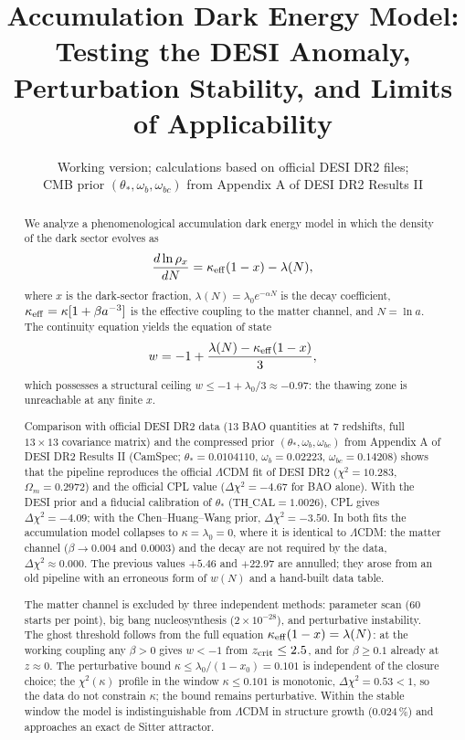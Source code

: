 \documentclass[11pt,a4paper]{article}
\title{Accumulation Dark Energy Model: Testing the DESI Anomaly,\\ Perturbation Stability, and Limits of Applicability}
\author{}
\date{Working version; calculations based on official DESI DR2 files;\\
CMB prior $(\theta_*,\omega_b,\omega_{bc})$ from Appendix A of DESI DR2 Results II}
\begin{document}
\maketitle

\begin{abstract}
We analyze a phenomenological accumulation dark energy model in which the density of the dark sector evolves as
\[
\frac{d\ln\rho_x}{dN}=\kappa_{\rm eff}(1-x)-\lambda(N),
\]
where $x$ is the dark-sector fraction, $\lambda(N)=\lambda_0 e^{-\alpha N}$ is the decay coefficient, $\kappa_{\rm eff}=\kappa[1+\beta a^{-3}]$ is the effective coupling to the matter channel, and $N=\ln a$. The continuity equation yields the equation of state
\[
w=-1+\frac{\lambda(N)-\kappa_{\rm eff}(1-x)}{3},
\]
which possesses a structural ceiling $w\le-1+\lambda_0/3\approx-0.97$: the thawing zone is unreachable at any finite $x$.

Comparison with official DESI DR2 data (13 BAO quantities at 7 redshifts, full $13\times13$ covariance matrix) and the compressed prior $(\theta_*,\omega_b,\omega_{bc})$ from Appendix A of DESI DR2 Results II (CamSpec; $\theta_*=0.0104110$, $\omega_b=0.02223$, $\omega_{bc}=0.14208$) shows that the pipeline reproduces the official $\Lambda$CDM fit of DESI DR2 ($\chi^2=10.283$, $\Omega_m=0.2972$) and the official CPL value ($\Delta\chi^2=-4.67$ for BAO alone). With the DESI prior and a fiducial calibration of $\theta_*$ ($\mathrm{TH\_CAL}=1.0026$), CPL gives $\Delta\chi^2=-4.09$; with the Chen--Huang--Wang prior, $\Delta\chi^2=-3.50$. In both fits the accumulation model collapses to $\kappa=\lambda_0=0$, where it is identical to $\Lambda$CDM: the matter channel ($\beta\to0.004$ and $0.0003$) and the decay are not required by the data, $\Delta\chi^2\approx0.000$. The previous values $+5.46$ and $+22.97$ are annulled; they arose from an old pipeline with an erroneous form of $w(N)$ and a hand-built data table.

The matter channel is excluded by three independent methods: parameter scan (60 starts per point), big bang nucleosynthesis ($2\times10^{-28}$), and perturbative instability. The ghost threshold follows from the full equation $\kappa_{\rm eff}(1-x)=\lambda(N)$: at the working coupling any $\beta>0$ gives $w<-1$ from $z_{\rm crit}\le2.5$, and for $\beta\ge0.1$ already at $z\approx0$. The perturbative bound $\kappa\le\lambda_0/(1-x_0)=0.101$ is independent of the closure choice; the $\chi^2(\kappa)$ profile in the window $\kappa\le0.101$ is monotonic, $\Delta\chi^2=0.53<1$, so the data do not constrain $\kappa$; the bound remains perturbative. Within the stable window the model is indistinguishable from $\Lambda$CDM in structure growth ($0.024\,\%$) and approaches an exact de Sitter attractor.
\end{abstract}
\end{document}
